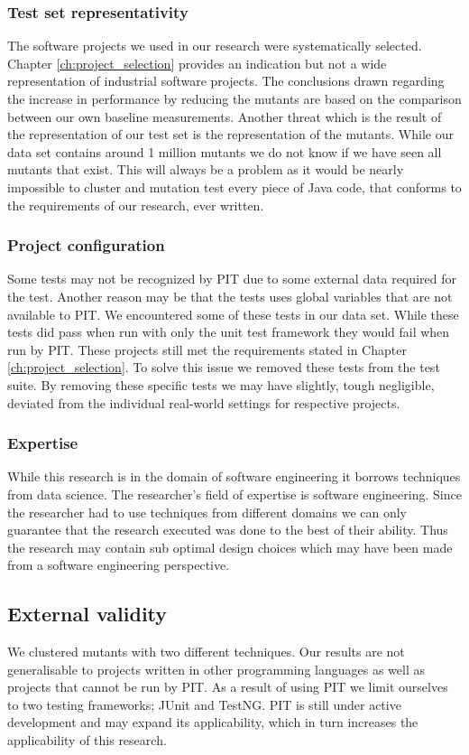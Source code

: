 \documentclass[../main]{subfiles}
\begin{document}
\subsubsection{Test set representativity}
The software projects we used in our research were systematically selected.
Chapter \ref{ch:project_selection} provides an indication but not a wide representation of industrial software projects.
The conclusions drawn regarding the increase in performance by reducing the mutants are based on the comparison between our own baseline measurements.
\newline
Another threat which is the result of the representation of our test set is the representation of the mutants.
While our data set contains around 1 million mutants we do not know if we have seen all mutants that exist.
This will always be a problem as it would be nearly impossible to cluster and mutation test every piece of Java code, that conforms to the requirements of our research, ever written.

\subsubsection{Project configuration}
Some tests may not be recognized by PIT due to some external data required for the test.
Another reason may be that the tests uses global variables that are not available to PIT.
We encountered some of these tests in our data set.
While these tests did pass when run with only the unit test framework they would fail when run by PIT.
These projects still met the requirements stated in Chapter \ref{ch:project_selection}.
To solve this issue we removed these tests from the test suite.
By removing these specific tests we may have slightly, tough negligible, deviated from the individual real-world settings for respective projects.

\subsubsection{Expertise}
While this research is in the domain of software engineering it borrows techniques from data science.
The researcher's field of expertise is software engineering.
Since the researcher had to use techniques from different domains we can only guarantee that the research executed was done to the best of their ability.
Thus the research may contain sub optimal design choices which may have been made from a software engineering perspective.

\subsection{External validity}
We clustered mutants with two different techniques.
Our results are not generalisable to projects written in other programming languages as well as projects that cannot be run by PIT.
As a result of using PIT we limit ourselves to two testing frameworks; JUnit and TestNG.
PIT is still under active development and may expand its applicability, which in turn increases the applicability of this research.
\end{document}
